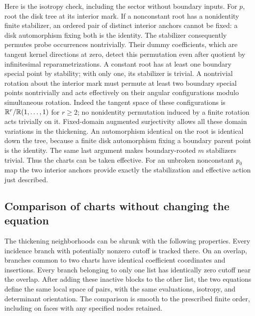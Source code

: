 Here is the isotropy check, including the sector without boundary inputs.
For $p$, root the disk tree at its interior mark.  If a nonconstant root
has a nonidentity finite stabilizer, an ordered pair of distinct interior
anchors cannot be fixed: a disk automorphism fixing both is the identity.
The stabilizer consequently permutes probe occurrences nontrivially.
Their dummy coefficients, which are tangent kernel directions at zero,
detect this permutation even after quotient by infinitesimal
reparametrizations.  A constant root has at least one boundary special
point by stability; with only one, its stabilizer is trivial.  A
nontrivial rotation about the interior mark must permute at least two
boundary special points nontrivially and acts effectively on their
angular configurations modulo simultaneous rotation.  Indeed the tangent
space of these configurations is $\mathbb R^r/\mathbb R(1,\ldots,1)$ for $r\ge2$;
no nonidentity permutation induced by a finite rotation acts trivially
on it.  Fixed-domain augmented surjectivity allows all these domain
variations in the thickening.  An automorphism identical on the root is
identical down the tree, because a finite disk automorphism fixing a
boundary parent point is the identity.  The same last argument makes
boundary-rooted $m$ stabilizers trivial.  Thus the charts can be taken
effective.  For an unbroken nonconstant $p_0$ map the two interior anchors
provide exactly the stabilization and effective action just described.

\subsection{Comparison of charts without changing the equation}

\begin{lemma}\label{virt:joint-charts}
The thickening neighborhoods can be shrunk with the following properties.
Every incidence branch with potentially nonzero cutoff is tracked there.
On an overlap, branches common to two charts have identical coefficient
coordinates and insertions.  Every branch belonging to only one list has
identically zero cutoff near the overlap.  After adding these inactive
blocks to the other list, the two equations define the same local space
of pairs, with the same evaluations, isotropy, and determinant orientation.
The comparison is smooth to the prescribed finite order, including on
faces with any specified nodes retained.
\end{lemma}

